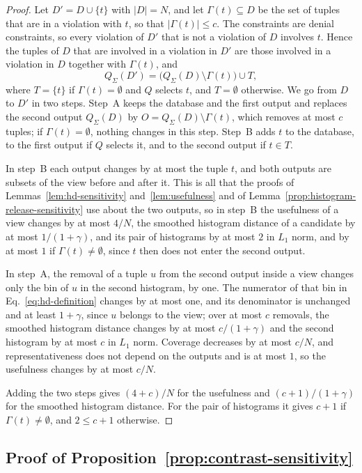 \begin{proof}
Let $D'=D\cup\{t\}$ with $|D|=N$, and let $\Gamma(t)\subseteq D$ be the set of tuples that are in a violation with $t$, so that $|\Gamma(t)|\le c$.
The constraints are denial constraints, so every violation of $D'$ that is not a violation of $D$ involves $t$.
Hence the tuples of $D$ that are involved in a violation in $D'$ are those involved in a violation in $D$ together with $\Gamma(t)$, and
\[
Q_\Sigma(D')=\big(Q_\Sigma(D)\setminus\Gamma(t)\big)\cup T ,
\]
where $T=\{t\}$ if $\Gamma(t)=\emptyset$ and $Q$ selects $t$, and $T=\emptyset$ otherwise.
We go from $D$ to $D'$ in two steps.
Step~A keeps the database and the first output and replaces the second output $Q_\Sigma(D)$ by $O=Q_\Sigma(D)\setminus\Gamma(t)$, which removes at most $c$ tuples; if $\Gamma(t)=\emptyset$, nothing changes in this step.
Step~B adds $t$ to the database, to the first output if $Q$ selects it, and to the second output if $t\in T$.

In step~B each output changes by at most the tuple $t$, and both outputs are subsets of the view before and after it.
This is all that the proofs of Lemmas~\ref{lem:hd-sensitivity} and~\ref{lem:usefulness} and of Lemma~\ref{prop:histogram-release-sensitivity} use about the two outputs, so in step~B the usefulness of a view changes by at most $4/N$, the smoothed histogram distance of a candidate by at most $1/(1+\gamma)$, and its pair of histograms by at most $2$ in $L_1$ norm, and by at most $1$ if $\Gamma(t)\neq\emptyset$, since $t$ then does not enter the second output.

In step~A, the removal of a tuple $u$ from the second output inside a view changes only the bin of $u$ in the second histogram, by one.
The numerator of that bin in Eq.~\eqref{eq:hd-definition} changes by at most one, and its denominator is unchanged and at least $1+\gamma$, since $u$ belongs to the view; over at most $c$ removals, the smoothed histogram distance changes by at most $c/(1+\gamma)$ and the second histogram by at most $c$ in $L_1$ norm.
Coverage decreases by at most $c/N$, and representativeness does not depend on the outputs and is at most $1$, so the usefulness changes by at most $c/N$.

Adding the two steps gives $(4+c)/N$ for the usefulness and $(c+1)/(1+\gamma)$ for the smoothed histogram distance.
For the pair of histograms it gives $c+1$ if $\Gamma(t)\neq\emptyset$, and $2\le c+1$ otherwise.
\end{proof}

\subsection{Proof of Proposition~\ref{prop:contrast-sensitivity}}
\label{app:proof-contrast}

